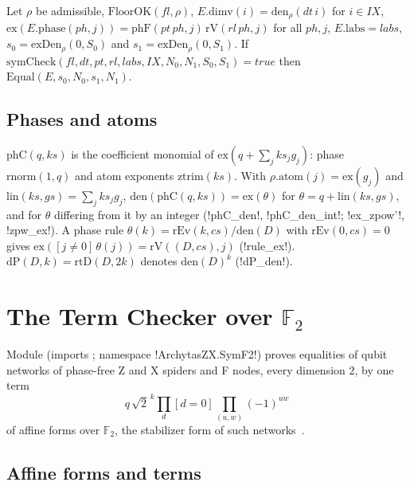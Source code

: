 \begin{theorem}\label{thm:lean-sym-equal-sym}
Let $\rho$ be admissible, $\mathrm{FloorOK}(\mathit{fl},\rho)$, $E.\mathrm{dimv}(i)=\mathrm{den}_\rho(\mathit{dt}\,i)$ for $i\in\mathit{IX}$, $\mathrm{ex}(E.\mathrm{phase}(\mathit{ph},j))=\mathrm{phF}(\mathit{pt}\,\mathit{ph},j)\,\mathrm{rV}(\mathit{rl}\,\mathit{ph},j)$ for all $\mathit{ph},j$, $E.\mathrm{labs}=\mathit{labs}$, $s_0=\mathrm{exDen}_\rho(0,S_0)$ and $s_1=\mathrm{exDen}_\rho(0,S_1)$. If $\mathrm{symCheck}(\mathit{fl},\mathit{dt},\mathit{pt},\mathit{rl},\mathit{labs},\mathit{IX},N_0,N_1,S_0,S_1)=\mathit{true}$ then $\mathrm{Equal}(E,s_0,N_0,s_1,N_1)$.
\end{theorem}

\subsection{Phases and atoms}

$\mathrm{phC}(q,ks)$ is the coefficient monomial of $\mathrm{ex}(q+\sum_jks_jg_j)$: phase $\mathrm{rnorm}(1,q)$ and atom exponents $\mathrm{ztrim}(ks)$. With $\rho.\mathrm{atom}(j)=\mathrm{ex}(g_j)$ and $\mathrm{lin}(ks,gs)=\sum_jks_jg_j$, $\mathrm{den}(\mathrm{phC}(q,ks))=\mathrm{ex}(\theta)$ for $\theta=q+\mathrm{lin}(ks,gs)$, and for $\theta$ differing from it by an integer (\lean!phC_den!, \lean!phC_den_int!; \lean!ex_zpow'!, \lean!zpw_ex!). A phase rule $\theta(k)=\mathrm{rEv}(k,cs)/\mathrm{den}(D)$ with $\mathrm{rEv}(0,cs)=0$ gives $\mathrm{ex}([j\neq0]\,\theta(j))=\mathrm{rV}((D,cs),j)$ (\lean!rule_ex!). $\mathrm{dP}(D,k)=\mathrm{rtD}(D,2k)$ denotes $\mathrm{den}(D)^k$ (\lean!dP_den!).

\section{The Term Checker over \texorpdfstring{$\mathbb{F}_2$}{F2}}\label{sec:lean-sym-f2}

Module  (imports ; namespace \lean!ArchytasZX.SymF2!) proves equalities of qubit networks of phase-free Z and X spiders and F nodes, every dimension $2$, by one term
\[
q\,\sqrt2^{\,k}\prod_{d}[d=0]\prod_{(u,w)}(-1)^{uw}
\]
of affine forms over $\mathbb{F}_2$, the stabilizer form of such networks~\cite{dehaene2003clifford}.

\subsection{Affine forms and terms}

